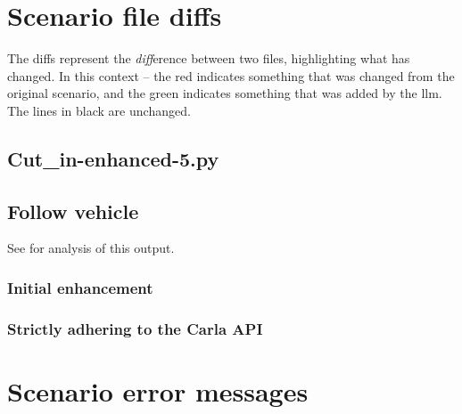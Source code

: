 \chapter{Scenario file diffs}\label{sec:fileDiffs}

The diffs represent the \emph{diff}erence between two files, highlighting what
has changed. In this context -- the red indicates something that was changed
from the original scenario, and the green indicates something that was added by
the \acrshort{llm}. The lines in black are unchanged.

\section{Cut\_in-enhanced-5.py }




\section{Follow vehicle}

See  for analysis of this output.

\subsection{Initial enhancement}




\subsection{Strictly adhering to the Carla API}



\chapter{Scenario error messages}\label{sec:errorMessages}

